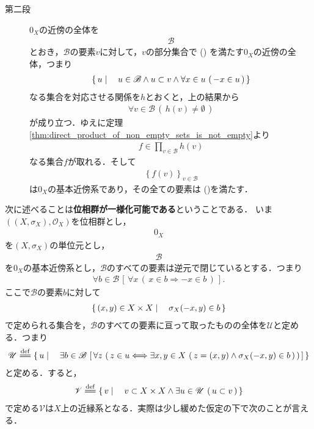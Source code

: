 \begin{sketch}
\begin{description}
			\item[第二段]
				$0_X$の近傍の全体を
				\begin{align}
					\mathscr{B}
				\end{align}
				とおき，$\mathscr{B}$の要素$v$に対して，$v$の部分集合で
				()
				を満たす$0_X$の近傍の全体，つまり
				\begin{align}
					\left\{\, u \mid \quad u \in \mathscr{B} \wedge u \subset v \wedge 
					\forall x \in u\, \left(\, -x \in u\, \right)\, \right\}
				\end{align}
				なる集合を対応させる関係を$h$とおくと，上の結果から
				\begin{align}
					\forall v \in \mathscr{B}\, \left(\, h(v) \neq \emptyset\, \right)
				\end{align}
				が成り立つ．ゆえに定理\ref{thm:direct_product_of_non_empty_sets_is_not_empty}より
				\begin{align}
					f \in \prod_{v \in \mathscr{B}} h(v)
				\end{align}
				なる集合$f$が取れる．そして
				\begin{align}
					\left\{f(v)\right\}_{v \in \mathscr{B}}
				\end{align}
				は$0_X$の基本近傍系であり，その全ての要素は
				()を満たす．
				\QED
		\end{description}
	\end{sketch}

	次に述べることは{\bf 位相群が一様化可能である}ということである．
	いま$\left(\left(X,\sigma_X\right),\mathscr{O}_X\right)$を位相群とし，
	\begin{align}
		0_X
	\end{align}
	を$\left(X,\sigma_X\right)$の単位元とし，
	\begin{align}
		\mathscr{B}
	\end{align}
	を$0_X$の基本近傍系とし，$\mathscr{B}$のすべての要素は逆元で閉じているとする．つまり
	\begin{align}
		\forall b \in \mathscr{B}\, \left[\, \forall x\, (\, x \in b \Longrightarrow -x \in b\, )\, \right].
	\end{align}
	ここで$\mathscr{B}$の要素$b$に対して
	\begin{align}
		\left\{\, (x,y) \in X \times X \mid \quad \sigma_X(-x,y) \in b\, \right\}
	\end{align}
	で定められる集合を，$\mathscr{B}$のすべての要素に亘って取ったものの全体を$\mathscr{U}$と定める．つまり
	\begin{align}
		\mathscr{U} \defeq \Set{u}{\exists b \in \mathscr{B}\,
		\left[\, \forall z\, \left(\, z \in u \Longleftrightarrow \exists x,y \in X\, 
		\left(\, z=(x,y) \wedge \sigma_X(-x,y) \in b\, \right)\, \right)\, \right]}
	\end{align}
	と定める．すると，
	\begin{align}
		\mathscr{V} \defeq \Set{v}{v \subset X \times X \wedge \exists u \in \mathscr{U}\, \left(\, u \subset v\, \right)}
	\end{align}
	で定める$\mathscr{V}$は$X$上の近縁系となる．実際は少し緩めた仮定の下で次のことが言える．
	
